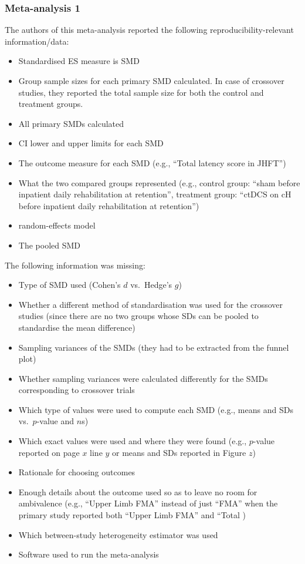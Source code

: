 \documentclass[
  man,floatsintext]{apa6}
\providecommand{\tightlist}{%
  \setlength{\itemsep}{0pt}\setlength{\parskip}{0pt}}
\begin{document}
\hypertarget{meta-analysis-1}{%
\subsubsection{Meta-analysis 1}\label{meta-analysis-1}}

The authors of this meta-analysis reported the following reproducibility-relevant information/data:

\begin{itemize}
\tightlist
\item
  Standardised ES measure is SMD
\item
  Group sample sizes for each primary SMD calculated. In case of crossover studies, they reported the total sample size for both the control and treatment groups.
\item
  All primary SMDs calculated
\item
  CI lower and upper limits for each SMD
\item
  The outcome measure for each SMD (e.g., ``Total latency score in JHFT'')
\item
  What the two compared groups represented (e.g., control group: ``sham before inpatient daily rehabilitation at retention'', treatment group: ``ctDCS on cH before inpatient daily
  rehabilitation at retention'')
\item
  random-effects model
\item
  The pooled SMD
\end{itemize}

The following information was missing:

\begin{itemize}
\tightlist
\item
  Type of SMD used (Cohen's \(d\) vs.~Hedge's \(g\))
\item
  Whether a different method of standardisation was used for the crossover studies (since there are no two groups whose SDs can be pooled to standardise the mean difference)
\item
  Sampling variances of the SMDs (they had to be extracted from the funnel plot)
\item
  Whether sampling variances were calculated differently for the SMDs corresponding to crossover trials
\item
  Which type of values were used to compute each SMD (e.g., means and SDs vs.~\(p\)-value and \(n\)s)
\item
  Which exact values were used and where they were found (e.g., \(p\)-value reported on page \(x\) line \(y\) or means and SDs reported in Figure \(z\))
\item
  Rationale for choosing outcomes
\item
  Enough details about the outcome used so as to leave no room for ambivalence (e.g., ``Upper Limb FMA'' instead of just ``FMA'' when the primary study reported both ``Upper Limb FMA'' and ``Total )
\item
  Which between-study heterogeneity estimator was used
\item
  Software used to run the meta-analysis
\end{itemize}
\end{document}

